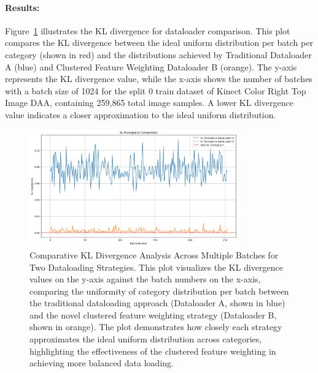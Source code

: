 \paragraph{Results:}
Figure~\ref{fig:kl_divergence_plot_0_001} illustrates the KL divergence for dataloader comparison. This plot compares the KL divergence between the ideal uniform distribution per batch per category (shown in red) and the distributions achieved by Traditional Dataloader A (blue) and Clustered Feature Weighting Dataloader B (orange). The y-axis represents the KL divergence value, while the x-axis shows the number of batches with a batch size of 1024 for the split 0 train dataset of Kinect Color Right Top Image DAA, containing 259,865 total image samples. A lower KL divergence value indicates a closer approximation to the ideal uniform distribution.

\begin{figure}[h]
\begin{center}
\includegraphics[width=0.8\textwidth]{Images_Thesis/Dataloader_comp/Images_0_001/output_with_uniform_kl_results_grid_0_001.png}
\end{center}
\caption[Comparative KL divergence analysis across multiple batches for dataloading strategies.]{Comparative KL Divergence Analysis Across Multiple Batches for Two Dataloading Strategies. This plot visualizes the KL divergence values on the y-axis against the batch numbers on the x-axis, comparing the uniformity of category distribution per batch between the traditional dataloading approach (Dataloader A, shown in blue) and the novel clustered feature weighting strategy (Dataloader B, shown in orange). The plot demonstrates how closely each strategy approximates the ideal uniform distribution across categories, highlighting the effectiveness of the clustered feature weighting in achieving more balanced data loading.}
\label{fig:kl_divergence_plot_0_001}
\end{figure}

